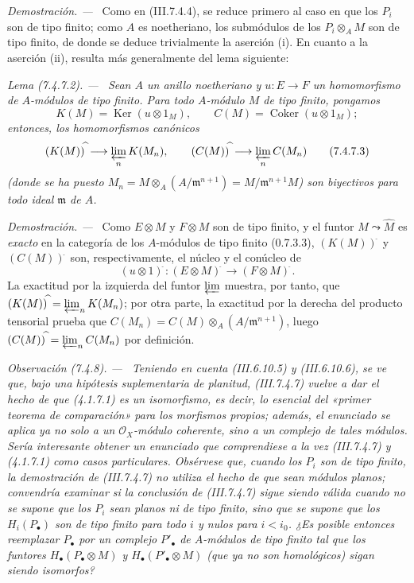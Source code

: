 \documentclass[10pt,oneside]{book}
\newcommand{\sh}[1]{\mathscr{#1}}
\newcommand{\Ker}{\operatorname{Ker}}
\newcommand{\Coker}{\operatorname{Coker}}
\newcommand{\sref}[2][]{\textup{(#2)}}
\newenvironment{lemma}[1][]{\par\medskip\noindent\itshape Lema (#1). ---\ }{\par}
\newenvironment{remark}[1][]{\par\medskip\noindent\itshape Observación (#1). ---\ }{\par}
\newenvironment{proof}{\par\medskip\noindent\textit{Demostración. ---\ }}{\par}
\begin{document}
\begin{proof}
Como en \sref{III.7.4.4}, se reduce primero al caso en que los $P_i$ son de
tipo finito; como $A$ es noetheriano, los submódulos de los
$P_i\otimes_A M$ son de tipo finito, de donde se deduce trivialmente la
aserción (i). En cuanto a la aserción (ii), resulta más generalmente del lema
siguiente:
\end{proof}

\begin{lemma}[7.4.7.2]
\label{III.7.4.7.2}
Sean $A$ un anillo noetheriano y $u:E\to F$ un homomorfismo de $A$-módulos de
tipo finito. Para todo $A$-módulo $M$ de tipo finito, pongamos
\[
  K(M)=\Ker(u\otimes1_M),
  \qquad
  C(M)=\Coker(u\otimes1_M);
\]
entonces, los homomorfismos canónicos
\[
  (K(M))^{\widehat{\,}}\longrightarrow\varprojlim_n K(M_n),
  \qquad
  (C(M))^{\widehat{\,}}\longrightarrow\varprojlim_n C(M_n)
  \tag{7.4.7.3}\label{III.7.4.7.3.eq}
\]
(donde se ha puesto
$M_n=M\otimes_A(A/\mathfrak m^{n+1})=M/\mathfrak m^{n+1}M$) son biyectivos
para todo ideal $\mathfrak m$ de $A$.
\end{lemma}

\begin{proof}
Como $E\otimes M$ y $F\otimes M$ son de tipo finito, y el funtor
$M\leadsto\widehat M$ es \emph{exacto} en la categoría de los $A$-módulos de tipo
finito \sref[0]{0.7.3.3}, $(K(M))^{\widehat{\,}}$ y $(C(M))^{\widehat{\,}}$ son,
respectivamente, el núcleo y el conúcleo de
\[
  (u\otimes1)^{\widehat{\,}}:
  (E\otimes M)^{\widehat{\,}}\longrightarrow(F\otimes M)^{\widehat{\,}}.
\]
La exactitud por la izquierda del funtor $\varprojlim$ muestra, por tanto, que
$(K(M))^{\widehat{\,}}=\varprojlim_n K(M_n)$; por otra parte, la exactitud por la
derecha del producto tensorial prueba que
$C(M_n)=C(M)\otimes_A(A/\mathfrak m^{n+1})$, luego
$(C(M))^{\widehat{\,}}=\varprojlim_n C(M_n)$ por definición.
\end{proof}

\begin{remark}[7.4.8]
\label{III.7.4.8}
Teniendo en cuenta \sref{III.6.10.5} y \sref{III.6.10.6}, se ve que, bajo una
hipótesis suplementaria de planitud, \sref{III.7.4.7} vuelve a dar el hecho de
que (4.1.7.1) es un isomorfismo, es decir, lo esencial del «primer teorema de
comparación» para los morfismos propios; además, el enunciado se aplica ya no
solo a un $\sh{O}_X$-módulo coherente, sino a un \emph{complejo} de tales módulos.
Sería interesante obtener un enunciado que comprendiese a la vez
\sref{III.7.4.7} y (4.1.7.1) como casos particulares. Obsérvese que, cuando los
$P_i$ son de tipo finito, la demostración de \sref{III.7.4.7} no utiliza el
hecho de que sean módulos planos; convendría examinar si la conclusión de
\sref{III.7.4.7} sigue siendo válida cuando no se supone que los $P_i$ sean
planos ni de tipo finito, sino que se supone que los $H_i(P_\bullet)$ son de
tipo finito para todo $i$ y nulos para $i<i_0$. ¿Es posible entonces reemplazar
$P_\bullet$ por un complejo $P'_\bullet$ de $A$-módulos de tipo finito tal que
los funtores $H_\bullet(P_\bullet\otimes M)$ y
$H_\bullet(P'_\bullet\otimes M)$ (que ya no son homológicos) sigan siendo
isomorfos?
\end{remark}
\end{document}
